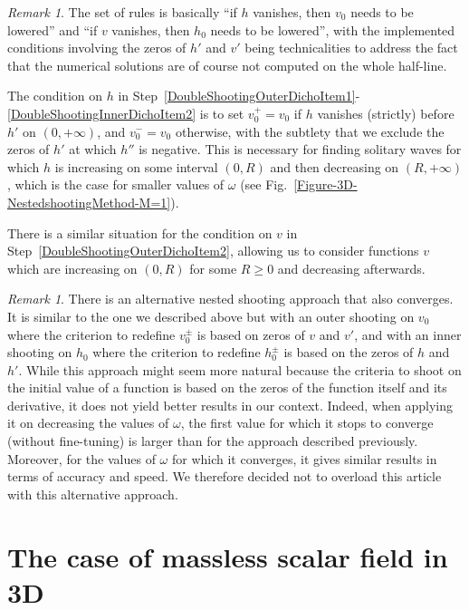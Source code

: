 \documentclass[12pt]{extarticle}
\theoremstyle{plain}
\theoremstyle{remark}
\newtheorem{remark}[lemma]{Remark}
\begin{document}
\begin{remark}
\label{remark-dicho-conditions}
The set of rules is basically ``if $h$ vanishes, then $v_0$ needs to be lowered'' and ``if $v$ vanishes, then $h_0$ needs to be lowered'', with the implemented conditions involving the zeros of $h'$ and $v'$ being technicalities to address the fact that the numerical solutions are of course not computed on the whole half-line.

The condition on $h$ in Step~\ref{DoubleShootingOuterDichoItem1}-\ref{DoubleShootingInnerDichoItem2} is to set $v_0^+=v_0$ if $h$ vanishes (strictly) before $h'$ on $(0,+\infty)$, and $v_0^-=v_0$ otherwise, with the subtlety that we exclude the zeros of $h'$ at which $h''$ is negative. This is necessary for finding solitary waves for which $h$ is increasing on some interval $(0,R)$ and then decreasing on $(R, +\infty)$, which is the case for smaller
values of $\omega$ (see Fig.~\ref{Figure-3D-NestedshootingMethod-M=1}).

There is a similar situation for the condition on $v$ in Step~\ref{DoubleShootingOuterDichoItem2}, allowing us to consider
functions $v$ which are
increasing on $(0,R)$ for some $R\geq0$
and decreasing afterwards.
\end{remark}

\begin{remark}
There is an alternative nested
shooting approach
 that also converges.
 It is similar to the one
 we described above
but with an outer shooting on $v_0$ where the criterion to redefine $v_0^\pm$ is based on zeros of $v$ and $v'$, and with an inner shooting on $h_0$ where the criterion to redefine $h_0^\pm$ is
based on the zeros of $h$ and $h'$. While this approach might seem more natural because the criteria to shoot on the initial value of a function is based on the zeros of the function itself and its derivative, it does not yield better results in our context. Indeed, when applying it on decreasing the values of $\omega$, the first value for which it stops to converge (without fine-tuning) is larger than for the approach described previously. Moreover, for the values of $\omega$ for which it converges, it gives similar results in terms of accuracy and speed. We therefore decided not to overload this
    article with this alternative approach.
\end{remark}

\section{The case of massless scalar field in 3D}
\label{sect-dkg-numerics-massless}
\end{document}
